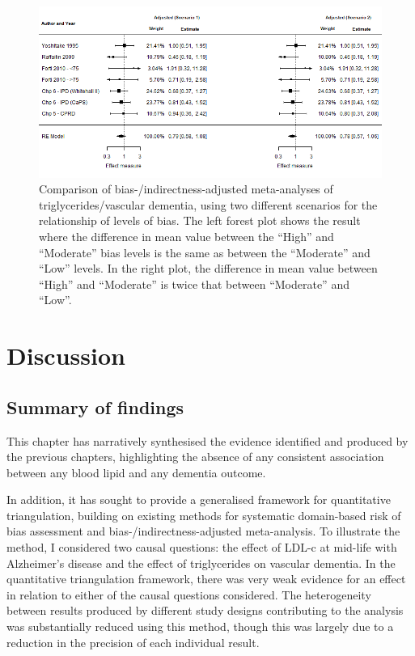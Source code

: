 \documentclass[a4paper, twoside]{templates/ociamthesis}
\begin{document}
~





\begin{figure}[H]
\includegraphics[width=1\linewidth]{figures/tri/fp_paired_midlife_tg_vad_scenarios} \caption[Comparison of bias-/indirectness-adjusted meta-analyses under two different scenarios of prior distributions of bias.]{Comparison of bias-/indirectness-adjusted meta-analyses of triglycerides/vascular dementia, using two different scenarios for the relationship of levels of bias. The left forest plot shows the result where the difference in mean value between the ``High'' and ``Moderate'' bias levels is the same as between the ``Moderate'' and ``Low'' levels. In the right plot, the difference in mean value between ``High'' and ``Moderate'' is twice that between ``Moderate'' and ``Low''.}\label{fig:fpTgVaDComparison}
\end{figure}

\hypertarget{discussion-4}{%
\section{Discussion}\label{discussion-4}}

\hypertarget{summary-of-findings-3}{%
\subsection{Summary of findings}\label{summary-of-findings-3}}

This chapter has narratively synthesised the evidence identified and produced by the previous chapters, highlighting the absence of any consistent association between any blood lipid and any dementia outcome.

In addition, it has sought to provide a generalised framework for quantitative triangulation, building on existing methods for systematic domain-based risk of bias assessment and bias-/indirectness-adjusted meta-analysis. To illustrate the method, I considered two causal questions: the effect of LDL-c at mid-life with Alzheimer's disease and the effect of triglycerides on vascular dementia. In the quantitative triangulation framework, there was very weak evidence for an effect in relation to either of the causal questions considered. The heterogeneity between results produced by different study designs contributing to the analysis was substantially reduced using this method, though this was largely due to a reduction in the precision of each individual result.
\end{document}

